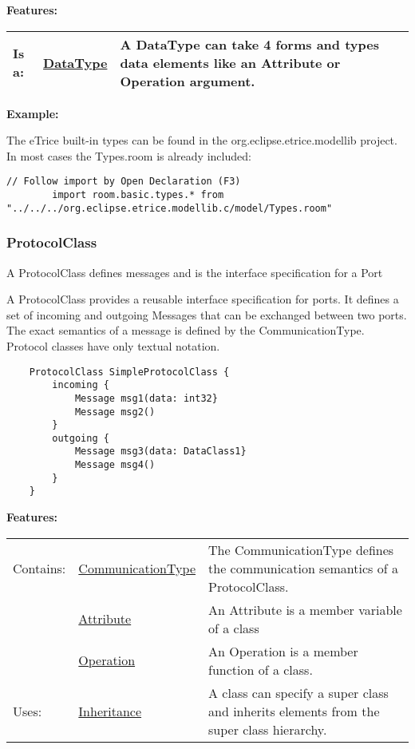 	\begingroup
	\textbf{Features:}
	\renewcommand{\arraystretch}{1.8} %
	\begin{longtable}{l|l p{}}
		\hline
	Is a: & \tabitem \hyperlink{ref:DataType}{DataType}  & A DataType can take 4 forms and types data elements like an Attribute or Operation argument.\\
	\hline
	\end{longtable}
	\endgroup
		
		
	\textbf{Example:}
	
		The eTrice built-in types can be found in the \textsf{org.eclipse.etrice.modellib} project. In most cases the \textsf{Types.room} is already included:
		\begin{lstlisting}[language=ROOM]
		// Follow import by Open Declaration (F3)
		import room.basic.types.* from "../../../org.eclipse.etrice.modellib.c/model/Types.room"
		\end{lstlisting}
	
	\vspace{\baselineskip}
	\vspace{\baselineskip}
	\vspace{\baselineskip}
	
\subsubsection{ProtocolClass}
	\hypertarget{ref:ProtocolClass}{}
	A ProtocolClass defines messages and is the interface specification for a Port
		
	A ProtocolClass provides a reusable interface specification for ports. It defines a set of incoming and outgoing Messages that can be exchanged between two ports.
	The exact semantics of a message is defined by the CommunicationType.
	Protocol classes have only textual notation.
	
	\begin{lstlisting}
	ProtocolClass SimpleProtocolClass {
		incoming {
			Message msg1(data: int32}
			Message msg2()
		}
		outgoing {
			Message msg3(data: DataClass1}
			Message msg4()
		}
	}
	\end{lstlisting}
		
		
	\begingroup
	\textbf{Features:}
	\renewcommand{\arraystretch}{1.8} %
	\begin{longtable}{l|l p{}}
		\hline
	Contains: & \tabitem \hyperlink{ref:CommunicationType}{CommunicationType}  & The CommunicationType defines the communication semantics of a ProtocolClass.\\
	& \tabitem \hyperlink{ref:Attribute}{Attribute}  & An Attribute is a member variable of a class \\
	& \tabitem \hyperlink{ref:Operation}{Operation}  & An Operation is a member function of a class. \\
	\hline
	Uses: & \tabitem \hyperlink{ref:Inheritance}{Inheritance}  & A class can specify a super class and inherits elements from the super class hierarchy.\\
	\hline
	\end{longtable}
	\endgroup
		

